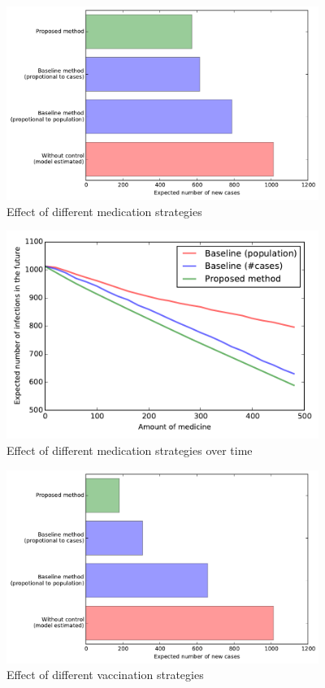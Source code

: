 \documentclass[11pt]{article}
\begin{document}
\begin{figure}[hbt]
\begin{center}
  \includegraphics[width=4in]{graph/res2.pdf}
  \caption{Effect of different medication strategies}
  \label{med}
\end{center}  
\end{figure}


\begin{figure}[hbt]
\begin{center}
  \includegraphics[width=4in]{graph/ev.pdf}
  \caption{Effect of different medication strategies over time}
  \label{ev}
\end{center}  
\end{figure}



\begin{figure}[hbt]
\begin{center}
  \includegraphics[width=4in]{graph/res4.pdf}
  \caption{Effect of different vaccination strategies}
  \label{med2}
\end{center}  
\end{figure}
\end{document}
